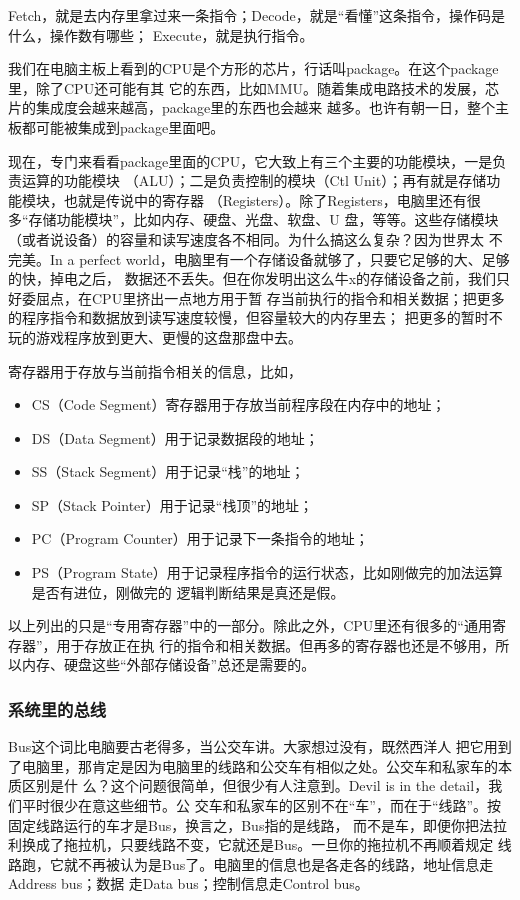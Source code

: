 \documentclass{wx672ctexart}
\begin{document}
Fetch，就是去内存里拿过来一条指令；Decode，就是“看懂”这条指令，操作码是什么，操作数有哪些；
Execute，就是执行指令。

我们在电脑主板上看到的CPU是个方形的芯片，行话叫package。在这个package里，除了CPU还可能有其
它的东西，比如MMU。随着集成电路技术的发展，芯片的集成度会越来越高，package里的东西也会越来
越多。也许有朝一日，整个主板都可能被集成到package里面吧。

现在，专门来看看package里面的CPU，它大致上有三个主要的功能模块，一是负责运算的功能模块
（ALU）；二是负责控制的模块（Ctl Unit）；再有就是存储功能模块，也就是传说中的寄存器
（Registers）。除了Registers，电脑里还有很多“存储功能模块”，比如内存、硬盘、光盘、软盘、U
盘，等等。这些存储模块（或者说设备）的容量和读写速度各不相同。为什么搞这么复杂？因为世界太
不完美。In a perfect world，电脑里有一个存储设备就够了，只要它足够的大、足够的快，掉电之后，
数据还不丢失。但在你发明出这么牛x的存储设备之前，我们只好委屈点，在CPU里挤出一点地方用于暂
存当前执行的指令和相关数据；把更多的程序指令和数据放到读写速度较慢，但容量较大的内存里去；
把更多的暂时不玩的游戏程序放到更大、更慢的这盘那盘中去。

寄存器用于存放与当前指令相关的信息，比如，
\begin{itemize}
\item CS（Code Segment）寄存器用于存放当前程序段在内存中的地址；
\item DS（Data Segment）用于记录数据段的地址；
\item SS（Stack Segment）用于记录“栈”的地址；
\item SP（Stack Pointer）用于记录“栈顶”的地址；
\item PC（Program Counter）用于记录下一条指令的地址；
\item PS（Program State）用于记录程序指令的运行状态，比如刚做完的加法运算是否有进位，刚做完的
逻辑判断结果是真还是假。
\end{itemize}

以上列出的只是“专用寄存器”中的一部分。除此之外，CPU里还有很多的“通用寄存器”，用于存放正在执
行的指令和相关数据。但再多的寄存器也还是不够用，所以内存、硬盘这些“外部存储设备”总还是需要的。

\subsubsection{系统里的总线}
\label{sec:orgb32525e}

Bus这个词比电脑要古老得多，当公交车讲。大家想过没有，既然西洋人
把它用到了电脑里，那肯定是因为电脑里的线路和公交车有相似之处。公交车和私家车的本质区别是什
么？这个问题很简单，但很少有人注意到。Devil is in the detail，我们平时很少在意这些细节。公
交车和私家车的区别不在“车”，而在于“线路”。按固定线路运行的车才是Bus，换言之，Bus指的是线路，
而不是车，即便你把法拉利换成了拖拉机，只要线路不变，它就还是Bus。一旦你的拖拉机不再顺着规定
线路跑，它就不再被认为是Bus了。电脑里的信息也是各走各的线路，地址信息走Address bus；数据
走Data bus；控制信息走Control bus。
\end{document}
